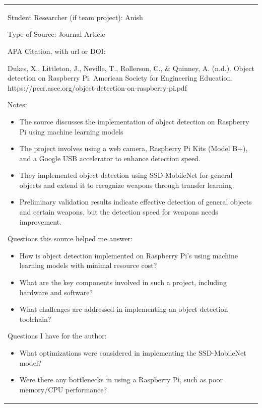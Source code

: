 \begin{longtable}[]{@{}
  >{\raggedright\arraybackslash}p{}@{}}
\toprule\noalign{}

Student Researcher (if team project): Anish


Type of Source: Journal Article


APA Citation, with url or DOI:

Dukes, X., Littleton, J., Neville, T., Rollerson, C., \& Quinney, A.
(n.d.). Object detection on Raspberry Pi. American Society for
Engineering Education.
https://peer.asee.org/object-detection-on-raspberry-pi.pdf


Notes:

\begin{itemize}
\item
  The source discusses the implementation of object detection on
  Raspberry Pi using machine learning models
\item
  The project involves using a web camera, Raspberry Pi Kits (Model B+),
  and a Google USB accelerator to enhance detection speed.
\item
  They implemented object detection using SSD-MobileNet for general
  objects and extend it to recognize weapons through transfer learning.
\item
  Preliminary validation results indicate effective detection of general
  objects and certain weapons, but the detection speed for weapons needs
  improvement.
\end{itemize}


Questions this source helped me answer:

\begin{itemize}
\item
  How is object detection implemented on Raspberry Pi's using machine
  learning models with minimal resource cost?
\item
  What are the key components involved in such a project, including
  hardware and software?
\item
  What challenges are addressed in implementing an object detection
  toolchain?
\end{itemize}


Questions I have for the author:

\begin{itemize}
\item
  What optimizations were considered in implementing the SSD-MobileNet
  model?
\item
  Were there any bottlenecks in using a Raspberry Pi, such as poor
  memory/CPU performance?
\end{itemize}



\end{longtable}
